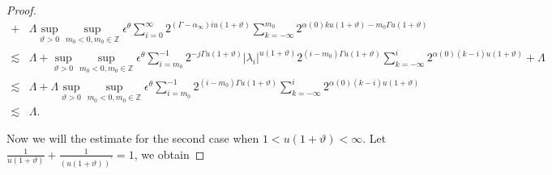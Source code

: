 \documentclass[oneside,reqno]{amsart}
\numberwithin{equation}{section}
\theoremstyle{definition}
\begin{document}
\begin{proof}
\begin{align*}
+ & \Lambda  \sup_{\vartheta>0 }\sup _{m_0<0  , m_0\in  \mathbb{Z}} \epsilon  ^\theta \sum_{i=0}^{\infty} 2^{\left(\Gamma-\alpha_{\infty}\right) iu (1+\vartheta)}  \sum_{k=-\infty}^{m_0} 2^{\alpha(0) k u(1+\vartheta)-m_0\Gamma u(1+\vartheta)}\\
\lesssim & \Lambda +\sup_{\vartheta>0 }\sup _{m_0<0, m_0\in  \mathbb{Z}}  \epsilon  ^\theta \sum_{i=m_0}^{-1}2^{-j\Gamma u(1+\vartheta)}\left|\lambda_{i}\right|^{u(1+\vartheta)} 2^{(i-m_0) \Gamma u(1+\vartheta)}\sum_{k=-\infty}^{i} 2^{\alpha(0)(k-i) u(1+\vartheta)}  + \Lambda \\
\lesssim & \Lambda + \Lambda \sup_{\vartheta>0 }\sup _{m_0<0, m_0\in  \mathbb{Z}}  \epsilon  ^\theta \sum_{i=m_0}^{-1} 2^{(i-m_0) \Gamma u(1+\vartheta)}\sum_{k=-\infty}^{i} 2^{\alpha(0)(k-i) u(1+\vartheta)}\\
\lesssim & \Lambda.
\end{align*}




Now we will the estimate for the second case when $1<u(1+\vartheta)<\infty$. Let $\frac{1}{u(1+\vartheta)}+ \frac{1}{(u(1+\vartheta))^\prime}=1$,  we obtain


\end{proof}
\end{document}
